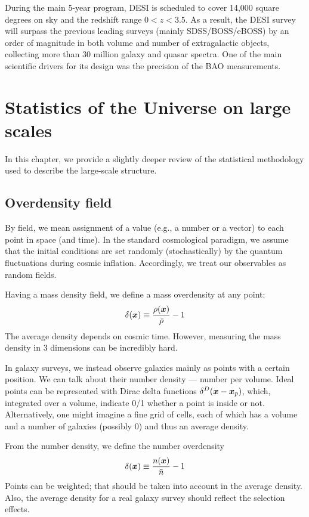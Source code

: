 During the main 5-year program, DESI is scheduled to cover 14,000 square degrees on sky and the redshift range $0<z<3.5$.
As a result, the DESI survey will surpass the previous leading surveys (mainly SDSS/BOSS/eBOSS) by an order of magnitude in both volume and number of extragalactic objects, collecting more than 30 million galaxy and quasar spectra.
One of the main scientific drivers for its design was the precision of the BAO measurements.

\section{Statistics of the Universe on large scales}

In this chapter, we provide a slightly deeper review of the statistical methodology used to describe the large-scale structure.

\subsection{Overdensity field}

By field, we mean assignment of a value (e.g., a number or a vector) to each point in space (and time).
In the standard cosmological paradigm, we assume that the initial conditions are set randomly (stochastically) by the quantum fluctuations during cosmic inflation.
Accordingly, we treat our observables as random fields.

Having a mass density field, we define a mass overdensity at any point:
\begin{equation}
    \delta \qty(\bm x) \equiv \frac{\rho \qty(\bm x)}{\bar \rho} - 1 \label{eq:mass-overdensity}
\end{equation}
The average density depends on cosmic time.
However, measuring the mass density in 3 dimensions can be incredibly hard.

In galaxy surveys, we instead observe galaxies mainly as points with a certain position.
We can talk about their number density --- number per volume.
Ideal points can be represented with Dirac delta functions $\delta^D \qty(\bm x - \bm x_p)$, which, integrated over a volume, indicate 0/1 whether a point is inside or not.
Alternatively, one might imagine a fine grid of cells, each of which has a volume and a number of galaxies (possibly 0) and thus an average density.

From the number density, we define the number overdensity
\begin{equation}
    \delta \qty(\bm x) \equiv \frac{n \qty(\bm x)}{\bar n} - 1 \label{eq:number-overdensity}
\end{equation}
Points can be weighted; that should be taken into account in the average density.
Also, the average density for a real galaxy survey should reflect the selection effects.

